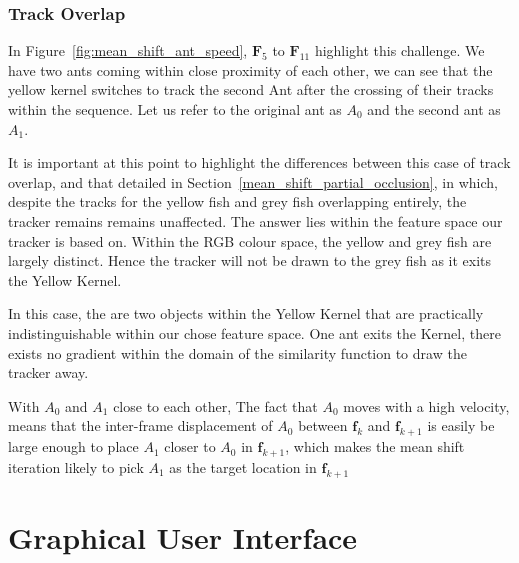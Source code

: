 \subsubsection{Track Overlap}\label{mean_shift_track_overlap}
In Figure~\ref{fig:mean_shift_ant_speed}, $\mathbf{F}_5$ to $\mathbf{F}_{11}$
highlight this challenge. We have two ants coming within close proximity of
each other, we can see that the yellow kernel switches to track the second Ant
after the crossing of their tracks within the sequence. Let us refer to the
original ant as $A_0$ and the second ant as $A_1$. 

It is important at this point to highlight the differences between this case of
track overlap, and that detailed in Section~\ref{mean_shift_partial_occlusion},
in which, despite the tracks for the yellow fish and grey fish overlapping
entirely, the tracker remains remains unaffected.
The answer lies within the feature space our tracker is based on. Within the RGB colour space,
the yellow and grey fish are largely distinct. Hence the tracker will not be
drawn to the grey fish as it exits the Yellow Kernel.

In this case, the are two objects within the Yellow Kernel that are practically
indistinguishable within our chose feature space. One ant exits the Kernel, there exists
no gradient within the domain of the similarity function to draw the tracker away.

With $A_0$ and $A_1$ close to each other, The fact that $A_0$ moves with a high
velocity, means that the inter-frame displacement of $A_0$ between
$\mathbf{f}_k$ and $\mathbf{f}_{k+1}$ is easily be large enough to place $A_1$
closer to $A_0$ in $\mathbf{f}_{k+1}$, which makes the mean shift iteration
likely to pick $A_1$ as the target location in $\mathbf{f}_{k+1}$

\section{Graphical User Interface}
